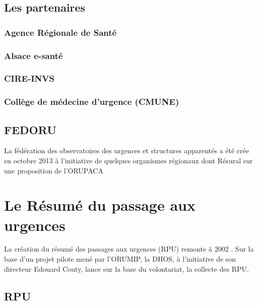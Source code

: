 \documentclass[12pt,english,french,twoside]{book}\usepackage[]{graphicx}\usepackage[]{color}
\begin{document}
\section*{Les partenaires}

  \subsection*{Agence Régionale de Santé}
    
  \subsection*{Alsace e-santé}
    
  \subsection*{CIRE-INVS}
    
  \subsection*{Collège de médecine d'urgence (CMUNE)}

\section*{FEDORU}
  
La fédération des observatoires des urgences et structures apparentés a été crée en octobre 2013 à l'initiative de quelques organismes régionaux dont Résural sur une proposition de l'ORUPACA 


\newpage
\chapter{Le Résumé du passage aux urgences}



La création du résumé des passages aux urgences (RPU) remonte à 2002 \cite{11}. Sur la base d'un projet pilote mené par l'ORUMIP, la DHOS, à l'initiative de son directeur Edouard Couty, lance sur la base du volontariat, la collecte des RPU.

\section*{RPU}
\end{document}
